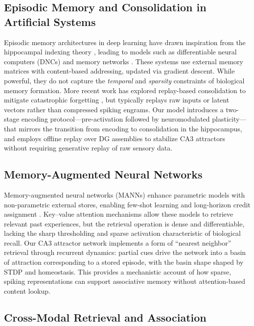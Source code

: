 \subsection{Episodic Memory and Consolidation in Artificial Systems}

Episodic memory architectures in deep learning have drawn inspiration from the hippocampal indexing theory \cite{tulving2002episodic}, leading to models such as differentiable neural computers (DNCs) \cite{graves2016hybrid} and memory networks \cite{weston2014memory}. These systems use external memory matrices with content-based addressing, updated via gradient descent. While powerful, they do not capture the \textit{temporal} and \textit{sparsity} constraints of biological memory formation. More recent work has explored replay-based consolidation to mitigate catastrophic forgetting \cite{shin2017continual}, but typically replays raw inputs or latent vectors rather than compressed spiking engrams. Our model introduces a two-stage encoding protocol---pre-activation followed by neuromodulated plasticity---that mirrors the transition from encoding to consolidation in the hippocampus, and employs offline replay over DG assemblies to stabilize CA3 attractors without requiring generative replay of raw sensory data.

\subsection{Memory-Augmented Neural Networks}

Memory-augmented neural networks (MANNs) enhance parametric models with non-parametric external stores, enabling few-shot learning and long-horizon credit assignment \cite{santoro2016meta}. Key--value attention mechanisms allow these models to retrieve relevant past experiences, but the retrieval operation is dense and differentiable, lacking the sharp thresholding and sparse activation characteristic of biological recall. Our CA3 attractor network implements a form of ``nearest neighbor'' retrieval through recurrent dynamics: partial cues drive the network into a basin of attraction corresponding to a stored episode, with the basin shape shaped by STDP and homeostasis. This provides a mechanistic account of how sparse, spiking representations can support associative memory without attention-based content lookup.

\subsection{Cross-Modal Retrieval and Association}

